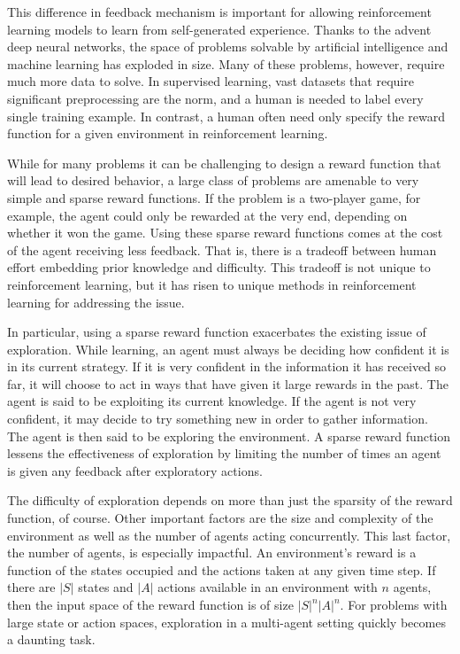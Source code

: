 \documentclass[11pt,journal,compsoc]{IEEEtran}
\begin{document}
This difference in feedback mechanism is important for allowing reinforcement learning models to learn from self-generated experience. Thanks to the advent deep neural networks, the space of problems solvable by artificial intelligence and machine learning has exploded in size. Many of these problems, however, require much more data to solve. In supervised learning, vast datasets that require significant preprocessing are the norm, and a human is needed to label every single training example. In contrast, a human often need only specify the reward function for a given environment in reinforcement learning. 

While for many problems it can be challenging to design a reward function that will lead to desired behavior, a large class of problems are amenable to very simple and sparse reward functions. If the problem is a two-player game, for example, the agent could only be rewarded at the very end, depending on whether it won the game. Using these sparse reward functions comes at the cost of the agent receiving less feedback. That is, there is a tradeoff between human effort embedding prior knowledge and difficulty. This tradeoff is not unique to reinforcement learning, but it has risen to unique methods in reinforcement learning for addressing the issue.

In particular, using a sparse reward function exacerbates the existing issue of exploration. While learning, an agent must always be deciding how confident it is in its current strategy. If it is very confident in the information it has received so far, it will choose to act in ways that have given it large rewards in the past. The agent is said to be exploiting its current knowledge. If the agent is not very confident, it may decide to try something new in order to gather information. The agent is then said to be exploring the environment. A sparse reward function lessens the effectiveness of exploration by limiting the number of times an agent is given any feedback after exploratory actions.

The difficulty of exploration depends on more than just the sparsity of the reward function, of course. Other important factors are the size and complexity of the environment as well as the number of agents acting concurrently. This last factor, the number of agents, is especially impactful. An environment's reward is a function of the states occupied and the actions taken at any given time step. If there are $\lvert S \rvert$ states and $\lvert A \rvert$ actions available in an environment with $n$ agents, then the input space of the reward function is of size $\lvert S \rvert^n \lvert A \rvert^n$. For problems with large state or action spaces, exploration in a multi-agent setting quickly becomes a daunting task.
\end{document}
